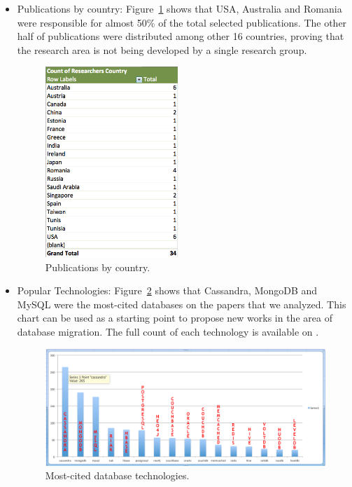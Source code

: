 \documentclass[]{tEIS2e}
\theoremstyle{plain}
\theoremstyle{remark}
\begin{document}
\begin{itemize}
\item{Publications by country: }
Figure~\ref{fig:pubVsCountry} shows that USA, Australia and Romania were responsible for almost 50\% of the total selected publications. The other half of publications were distributed among other 16 countries, proving that the research area is not being developed by a single research group. 
\begin{figure}[htb!]
\centering
\includegraphics[width=50mm]{graph3.png}
\caption{Publications by country. \label{fig:pubVsCountry}}
\end{figure}



\item{Popular Technologies: }
Figure~\ref{fig:mostCitedDB} shows that Cassandra, MongoDB and MySQL were the most-cited databases on the papers that we analyzed. This chart can be used as a starting point to propose new works in the area of database migration. The full count of each technology is available on \citep{fullDBJson}.
\begin{figure}[htb!]
\centering
\includegraphics[width=120mm]{database_count_2.png}
\caption{Most-cited database technologies. \label{fig:mostCitedDB}}
\end{figure}


\end{itemize}
\end{document}
